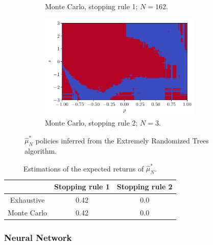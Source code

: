 \documentclass[a4paper, 12pt]{article}
\begin{document}
\begin{figure}[H]
\begin{subfigure}{0.49\textwidth}
            \caption{Monte Carlo, stopping rule 1; $N = 162$.}
        \end{subfigure}
        \hfill
        \begin{subfigure}{0.49\textwidth}
            \centering
            \includegraphics[width=0.85\textwidth]{resources/pdf/4_montecarlo_2_XRT_mu.pdf}
            \caption{Monte Carlo, stopping rule 2; $N = 3$.}
        \end{subfigure}
        \caption{$\hat{\mu}_{N}^{*}$ policies inferred from the Extremely Randomized Trees algorithm.}
        \label{fig:mu.xrt}
    \end{figure}
    
    \begin{table}[H]
        \centering
        \begin{tabular}{c|c|c}
            & Stopping rule 1 & Stopping rule 2 \\
            \hline
            Exhaustive & \num{0.42} & \num{0.0} \\
            Monte Carlo & \num{0.42} & \num{0.0} \\
        \end{tabular}
        \caption{Estimations of the expected returns of $\hat{\mu}^*_N$.}
        \label{tab:expected.return.mu.xrt}
    \end{table}
    
    \newpage
    
    \subsubsection{Neural Network}
	
\end{document}
